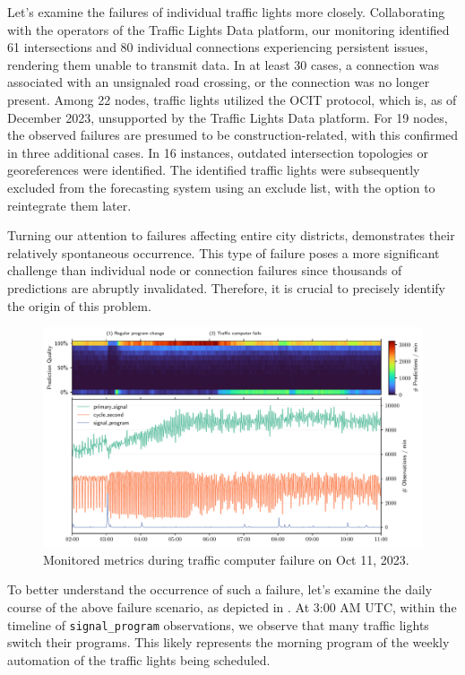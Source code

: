Let's examine the failures of individual traffic lights more closely. Collaborating with the operators of the Traffic Lights Data platform, our monitoring identified 61 intersections and 80 individual connections experiencing persistent issues, rendering them unable to transmit data. In at least 30 cases, a connection was associated with an unsignaled road crossing, or the connection was no longer present. Among 22 nodes, traffic lights utilized the OCIT protocol, which is, as of December 2023, unsupported by the Traffic Lights Data platform. For 19 nodes, the observed failures are presumed to be construction-related, with this confirmed in three additional cases. In 16 instances, outdated intersection topologies or georeferences were identified. The identified traffic lights were subsequently excluded from the forecasting system using an exclude list, with the option to reintegrate them later.

Turning our attention to failures affecting entire city districts,  demonstrates their relatively spontaneous occurrence. This type of failure poses a more significant challenge than individual node or connection failures since thousands of predictions are abruptly invalidated. Therefore, it is crucial to precisely identify the origin of this problem.

\begin{figure}[t]
    \centering
    \includegraphics[width=\linewidth]{images/monitoring-failure.pdf}
    \caption{Monitored metrics during traffic computer failure on Oct 11, 2023.}\label{fig:monitoring-failure}
\end{figure}

To better understand the occurrence of such a failure, let's examine the daily course of the above failure scenario, as depicted in . At 3:00 AM UTC, within the timeline of \texttt{signal\_program} observations, we observe that many traffic lights switch their programs. This likely represents the morning program of the weekly automation of the traffic lights being scheduled.

